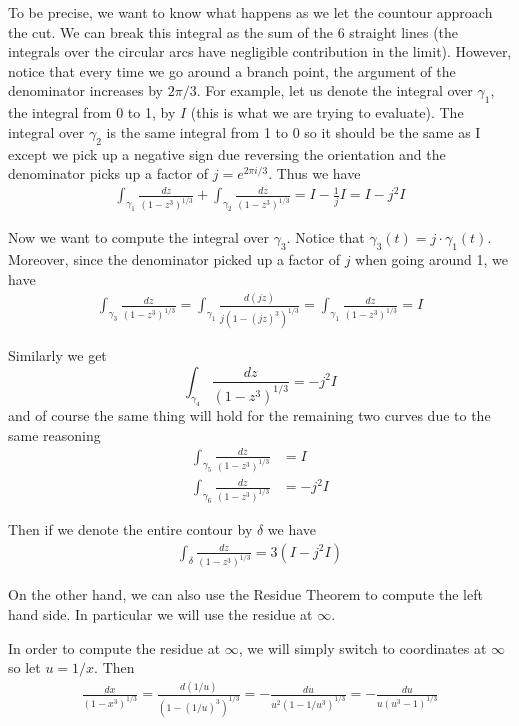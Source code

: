 To be precise, we want to know what happens as we let the countour approach the cut. We can break this integral as the sum of the 6 straight lines (the integrals over the circular arcs have negligible contribution in the limit). However, notice that every time we go around a branch point, the argument of the denominator increases by $2 \pi/3$. For example, let us denote the integral over $\gamma_1$, the integral from 0 to 1, by $I$ (this is what we are trying to evaluate). The integral over $\gamma_2$ is the same integral from 1 to 0 so it should be the same as I except we pick up a negative sign due reversing the orientation and the denominator picks up a factor of $j = e^{2 \pi i/3}$. Thus we have 
\begin{align*}
    \int_{\gamma_1} \frac{dz}{(1 - z^3)^{1/3}} + \int_{\gamma_2} \frac{dz}{(1 - z^3)^{1/3}} = I - \frac{1}{j}I = I - j^2 I
\end{align*}

Now we want to compute the integral over $\gamma_3$. Notice that $\gamma_3(t) = j \cdot \gamma_1(t)$. Moreover, since the denominator picked up a factor of $j$ when going around 1, we have
\begin{align*}
    \int_{\gamma_3} \frac{dz}{(1 - z^3)^{1/3}} = \int_{\gamma_1} \frac{d(jz)}{j(1 - (jz)^3)^{1/3}} = \int_{\gamma_1} \frac{dz}{(1 - z^3)^{1/3}} = I
\end{align*} 

Similarly we get 
$$ \int_{\gamma_4} \frac{dz}{(1 - z^3)^{1/3}} = -j^2 I $$
and of course the same thing will hold for the remaining two curves due to the same reasoning
\begin{align*}
    \int_{\gamma_5} \frac{dz}{(1 - z^3)^{1/3}} &= I\\
    \int_{\gamma_6} \frac{dz}{(1 - z^3)^{1/3}} &= -j^2 I
\end{align*}

Then if we denote the entire contour by $\delta$ we have 
\begin{align*}
    \int_{\delta} \frac{dz}{(1 - z^3)^{1/3}} = 3(I - j^2 I)
\end{align*}

On the other hand, we can also use the Residue Theorem to compute the left hand side. In particular we will use the residue at $\infty$. 

In order to compute the residue at $\infty$, we will simply switch to coordinates at $\infty$ so let $u = 1/x$. Then 
\begin{align*}
    \frac{dx}{(1 - x^3)^{1/3}} = \frac{d(1/u)}{(1 - (1/u)^3)^{1/3}} = -\frac{du}{u^2(1 - 1/u^3)^{1/3}} = - \frac{du}{u(u^3 - 1)^{1/3}}
\end{align*}

